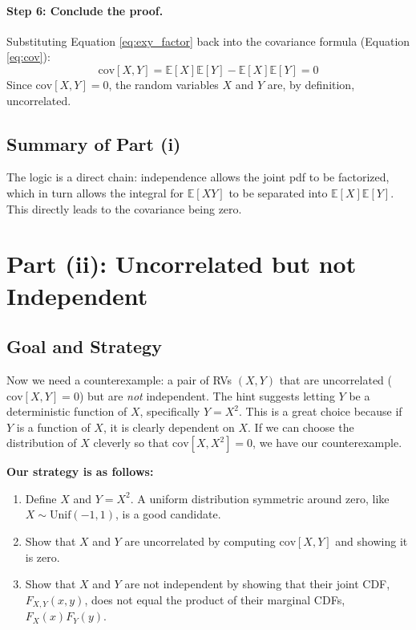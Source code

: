 \documentclass[11pt,a4paper]{article}
\begin{document}
\paragraph{Step 6: Conclude the proof.}
Substituting Equation \ref{eq:exy_factor} back into the covariance formula (Equation \ref{eq:cov}):
\begin{equation*}
    \text{cov}[X, Y] = \mathbb{E}[X]\mathbb{E}[Y] - \mathbb{E}[X]\mathbb{E}[Y] = 0
\end{equation*}
Since $\text{cov}[X, Y] = 0$, the random variables $X$ and $Y$ are, by definition, uncorrelated.

\subsection{Summary of Part (i)}
The logic is a direct chain: independence allows the joint pdf to be factorized, which in turn allows the integral for $\mathbb{E}[XY]$ to be separated into $\mathbb{E}[X]\mathbb{E}[Y]$. This directly leads to the covariance being zero.

\section{Part (ii): Uncorrelated but not Independent}

\subsection{Goal and Strategy}
Now we need a counterexample: a pair of RVs $(X, Y)$ that are uncorrelated ($\text{cov}[X, Y] = 0$) but are \emph{not} independent. The hint suggests letting $Y$ be a deterministic function of $X$, specifically $Y=X^2$. This is a great choice because if $Y$ is a function of $X$, it is clearly dependent on $X$. If we can choose the distribution of $X$ cleverly so that $\text{cov}[X, X^2] = 0$, we have our counterexample.

\textbf{Our strategy is as follows:}
\begin{enumerate}
    \item Define $X$ and $Y=X^2$. A uniform distribution symmetric around zero, like $X \sim \text{Unif}(-1, 1)$, is a good candidate.
    \item Show that $X$ and $Y$ are uncorrelated by computing $\text{cov}[X, Y]$ and showing it is zero.
    \item Show that $X$ and $Y$ are not independent by showing that their joint CDF, $F_{X,Y}(x,y)$, does not equal the product of their marginal CDFs, $F_X(x)F_Y(y)$.
\end{enumerate}
\end{document}
